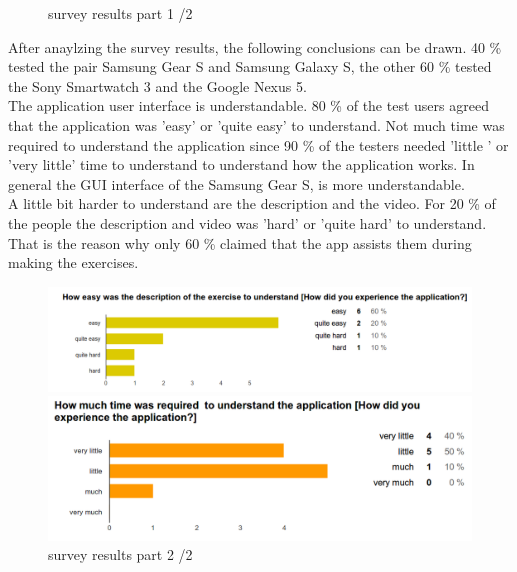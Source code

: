 \begin{figure}[b!]
\begin{minipage}{0.3\textwidth}
    \end{minipage}
  \caption{survey results part 1 /2 }
  \label{fig:survey1}
\end{figure}


After anaylzing the survey results, the following conclusions can be drawn. 40 \% tested the pair Samsung Gear S and Samsung Galaxy S, the other 60 \% tested the Sony Smartwatch 3 and the Google Nexus 5.
\\
The application user interface is understandable. 80 \% of the test users agreed that the application was 'easy' or 'quite easy' to understand. Not much time was required to understand the application since 90 \% of the testers needed 'little ' or 'very little' time to understand to understand how the application works. In general the GUI interface of the Samsung Gear S, is more understandable.\\
A little bit harder to understand are the description and the video. For 20 \% of the people the description and video was 'hard' or 'quite hard' to understand. That is the reason why only 60 \% claimed that the app assists them during making the exercises.
\begin{figure}[b!]
  \centering
    \begin{minipage}{0.3\textwidth}
      \centering
        \includegraphics[width=1\textwidth]{00_resources/figures/survey_results4.png}
    \end{minipage}
    \begin{minipage}{0.3\textwidth}
      \centering
        \includegraphics[width=1\textwidth]{00_resources/figures/survey_results5.png}
    \end{minipage}
  \caption{survey results part 2 /2 }
  \label{fig:survey2}
\end{figure}
